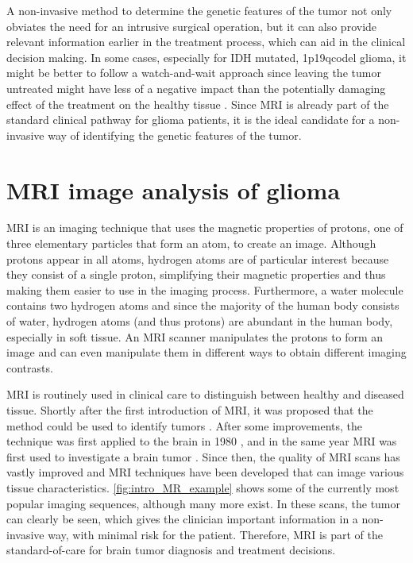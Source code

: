 A non-invasive method to determine the genetic features of the \gls{tumor} not only obviates the need for an intrusive surgical operation, but it can also provide relevant information earlier in the treatment process, which can aid in the clinical decision making.
In some cases, especially for \gls{IDH} mutated, \acl{1p19qcodel} \gls{glioma}, it might be better to follow a watch-and-wait approach since leaving the \gls{tumor} untreated might have less of a negative impact than the potentially damaging effect of the treatment on the healthy tissue \autocite{vandenbent2012lggtreatment, welle2017EANO}.
Since \gls{MRI} is already part of the standard clinical pathway for glioma patients, it is the ideal candidate for a non-invasive way of identifying the genetic features of the \gls{tumor}.

\section{MRI image analysis of glioma}

\gls{MRI} is an imaging technique that uses the magnetic properties of protons, one of three elementary particles that form an atom, to create an image.
Although protons appear in all atoms, hydrogen atoms are of particular interest because they consist of a single proton, simplifying their magnetic properties and thus making them easier to use in the imaging process.
Furthermore, a water molecule contains two hydrogen atoms and since the majority of the human body consists of water, hydrogen atoms (and thus protons) are abundant in the human body, especially in soft tissue.
An \gls{MRI} scanner manipulates the protons to form an image and can even manipulate them in different ways to obtain different imaging contrasts.

\gls{MRI} is routinely used in clinical care to distinguish between healthy and diseased tissue.
Shortly after the first introduction of \gls{MRI}, it was proposed that the method could be used to identify \glspl{tumor} \autocite{damadian1971tumor}.
After some improvements, the technique was first applied to the brain in 1980 \autocite{holland1980brain}, and in the same year MRI was first used to investigate a brain \gls{tumor} \autocite{hawkes1980NMRbrain}.
Since then, the quality of \gls{MRI} scans has vastly improved and \gls{MRI} techniques have been developed that can image various tissue characteristics.
\cref{fig:intro_MR_example} shows some of the currently most popular imaging sequences, although many more exist.
In these scans, the \gls{tumor} can clearly be seen, which gives the clinician important information in a non-invasive way, with minimal risk for the patient.
Therefore, \gls{MRI} is part of the standard-of-care for brain \gls{tumor} diagnosis and treatment decisions.

